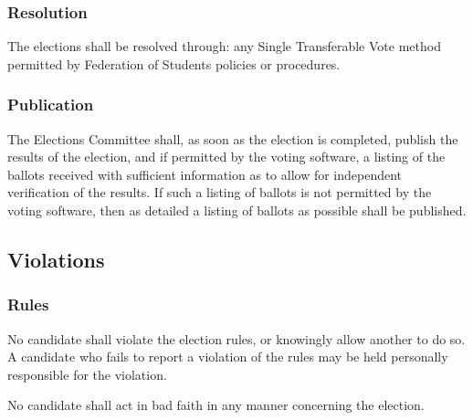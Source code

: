\subsubsection{Resolution}
The elections shall be resolved through: any Single Transferable Vote method permitted by Federation of Students policies or procedures.

\subsubsection{Publication}
\label{elections:voting:publication}
The Elections Committee shall, as soon as the election is completed, publish the results of the election, and if permitted by the voting software, a listing of the ballots received with sufficient information as to allow for independent verification of the results.
If such a listing of ballots is not permitted by the voting software, then as detailed a listing of ballots as possible shall be published.

\subsection{Violations}
\subsubsection{Rules}
No candidate shall violate the election rules, or knowingly allow another to do so.
A candidate who fails to report a violation of the rules may be held personally responsible for the violation.

No candidate shall act in bad faith in any manner concerning the election.
